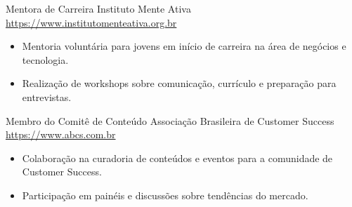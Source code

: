 \documentclass[a4paper, serif, 10pt]{moderncv}
\begin{document}
        {Mentora de Carreira}
        {Instituto Mente Ativa}
        {\url{https://www.institutomenteativa.org.br}}
        {}
        {\begin{itemize}
\item Mentoria voluntária para jovens em início de carreira na área de negócios e tecnologia.
\item Realização de workshops sobre comunicação, currículo e preparação para entrevistas.
\end{itemize}}
    

        {Membro do Comitê de Conteúdo}
        {Associação Brasileira de Customer Success}
        {\url{https://www.abcs.com.br}}
        {}
        {\begin{itemize}
\item Colaboração na curadoria de conteúdos e eventos para a comunidade de Customer Success.
\item Participação em painéis e discussões sobre tendências do mercado.
\end{itemize}}
    
\end{document}
